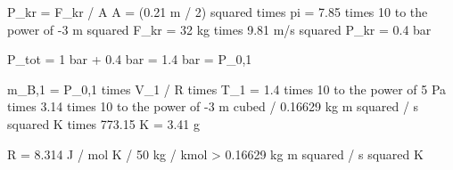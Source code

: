 P_kr = F_kr / A  
A = (0.21 m / 2) squared times pi = 7.85 times 10 to the power of -3 m squared  
F_kr = 32 kg times 9.81 m/s squared  
P_kr = 0.4 bar  

P_tot = 1 bar + 0.4 bar = 1.4 bar = P_0,1  

m_B,1 = P_0,1 times V_1 / R times T_1 = 1.4 times 10 to the power of 5 Pa times 3.14 times 10 to the power of -3 m cubed / 0.16629 kg m squared / s squared K times 773.15 K = 3.41 g  

R = 8.314 J / mol K / 50 kg / kmol > 0.16629 kg m squared / s squared K